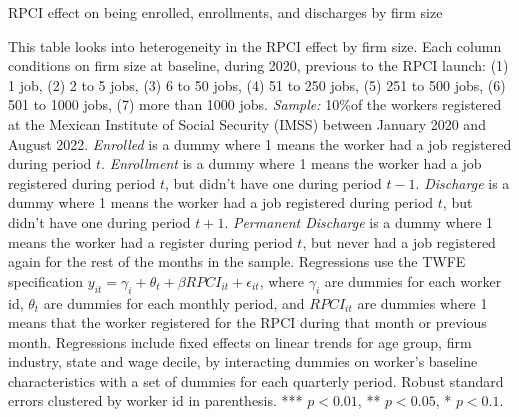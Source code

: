 \documentclass[oneside,11pt]{article}
\begin{document}
\begin{landscape}

\begin{table}[H]
    \caption{RPCI effect on being enrolled, enrollments, and discharges by firm size}
    \label{twfe_job_hetero_firm_size}
    \begin{center}
    \scriptsize{}
    \end{center}
\end{table}
\tiny{
\noindent This table looks into heterogeneity in the RPCI effect by firm size. Each column conditions on firm size at baseline, during 2020, previous to the RPCI launch: (1) 1 job, (2) 2 to 5 jobs, (3) 6 to 50 jobs, (4) 51 to 250 jobs, (5) 251 to 500 jobs, (6) 501 to 1000 jobs, (7) more than 1000 jobs. \textit{Sample:} 10\%of the workers registered at the Mexican Institute of Social Security (IMSS) between January 2020 and August 2022. \textit{Enrolled} is a dummy where 1 means the worker had a job registered during period $t$. \textit{Enrollment} is a dummy where 1 means the worker had a job registered during period $t$, but didn't have one during period $t-1$. \textit{Discharge} is a dummy where 1 means the worker had a job registered during period $t$, but didn't have one during period $t+1$. \textit{Permanent Discharge} is a dummy where 1 means the worker had a register during period $t$, but never had a job registered again for the rest of the months in the sample. Regressions use the TWFE specification $y_{it} = \gamma_{i} + \theta_{t}+ \beta RPCI_{it} +\epsilon_{it}$, where $\gamma_{i}$ are dummies for each worker id, $\theta_{t}$ are dummies for each monthly period, and $RPCI_{it}$ are dummies where 1 means that the worker registered for the RPCI during that month or previous month. Regressions include fixed effects on linear trends for age group, firm industry, state and wage decile, by interacting dummies on worker's baseline characteristics with a set of dummies for each quarterly period. Robust standard errors clustered by worker id in parenthesis. *** $p<0.01$, ** $p<0.05$, * $p<0.1$.
}

\end{landscape}

\clearpage
\end{document}
